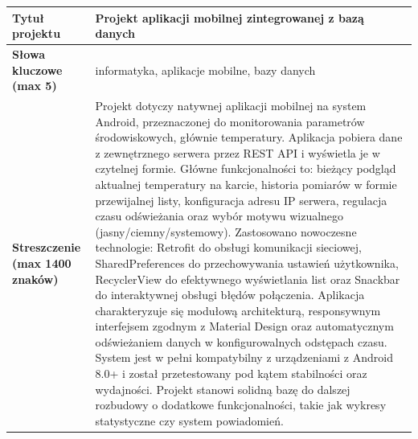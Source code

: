 \noindent
\begin{tabular}{|p{5cm}|p{10cm}|}
\hline
\textbf{Tytuł projektu} & Projekt aplikacji mobilnej zintegrowanej z bazą danych\\
\hline
\textbf{Słowa kluczowe (max 5)} & informatyka, aplikacje mobilne, bazy danych\\
\hline
\textbf{Streszczenie (max 1400 znaków)} & Projekt dotyczy natywnej aplikacji mobilnej na system Android, przeznaczonej do monitorowania parametrów środowiskowych, głównie temperatury. Aplikacja pobiera dane z zewnętrznego serwera przez REST API i wyświetla je w czytelnej formie. Główne funkcjonalności to: bieżący podgląd aktualnej temperatury na karcie, historia pomiarów w formie przewijalnej listy, konfiguracja adresu IP serwera, regulacja czasu odświeżania oraz wybór motywu wizualnego (jasny/ciemny/systemowy). Zastosowano nowoczesne technologie: Retrofit do obsługi komunikacji sieciowej, SharedPreferences do przechowywania ustawień użytkownika, RecyclerView do efektywnego wyświetlania list oraz Snackbar do interaktywnej obsługi błędów połączenia. Aplikacja charakteryzuje się modułową architekturą, responsywnym interfejsem zgodnym z Material Design oraz automatycznym odświeżaniem danych w konfigurowalnych odstępach czasu. System jest w pełni kompatybilny z urządzeniami z Android 8.0+ i został przetestowany pod kątem stabilności oraz wydajności. Projekt stanowi solidną bazę do dalszej rozbudowy o dodatkowe funkcjonalności, takie jak wykresy statystyczne czy system powiadomień. \\
\hline
\end{tabular}

\vspace{1.5cm}
